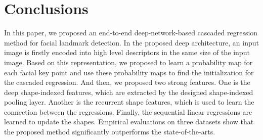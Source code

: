 \documentclass[journal]{IEEEtran}
\begin{document}



\section{Conclusions}
\label{conclusion}
In this paper, we proposed an end-to-end deep-network-based cascaded regression method for facial landmark detection. In the proposed deep architecture, an input image is firstly encoded into high level descriptors in the same size of the input image. Based on this representation, we proposed to learn a probability map for each facial key point and use these probability maps to find the initialization for the cascaded regression. And then, we proposed two strong features. One is the deep shape-indexed features, which are extracted by the designed shape-indexed pooling layer. Another is the recurrent shape features, which is used to learn the connection between the regressions. Finally, the sequential linear regressions are learned to update the shapes. Empirical evaluations on three datasets show that the proposed method significantly outperforms the state-of-the-arts.
\end{document}
